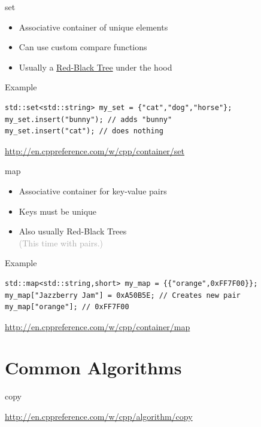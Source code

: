 \documentclass{beamer}
\begin{document}
\begin{frame}[fragile]{set}
	\begin{itemize}
		\item Associative container of unique elements
		\item Can use custom compare functions
		\item Usually a \href{https://en.wikipedia.org/wiki/Red-black_tree}{Red-Black Tree} under the hood
	\end{itemize}
	\bigskip
	\begin{exampleblock}{Example}
\begin{verbatim}
std::set<std::string> my_set = {"cat","dog","horse"};
my_set.insert("bunny"); // adds "bunny"
my_set.insert("cat"); // does nothing
\end{verbatim}
	\end{exampleblock}
	\bigskip
	\begin{center}
		\tiny \url{http://en.cppreference.com/w/cpp/container/set}
	\end{center}
\end{frame}

\begin{frame}[fragile]{map}
	\begin{itemize}
		\item Associative container for key-value pairs
		\item Keys must be unique
		\item Also usually Red-Black Trees \\
		\textcolor{darkgray}{(This time with pairs.)}
	\end{itemize}
	\bigskip
	\begin{exampleblock}{Example}
\begin{verbatim}
std::map<std::string,short> my_map = {{"orange",0xFF7F00}};
my_map["Jazzberry Jam"] = 0xA50B5E; // Creates new pair
my_map["orange"]; // 0xFF7F00
\end{verbatim}
	\end{exampleblock}
	\bigskip
	\begin{center}
		\tiny \url{http://en.cppreference.com/w/cpp/container/map}
	\end{center}
\end{frame}

\section{Common Algorithms}

\begin{frame}{copy}
	\bigskip
	\begin{center}
		\tiny \url{http://en.cppreference.com/w/cpp/algorithm/copy}
	\end{center}
\end{frame}
\end{document}
